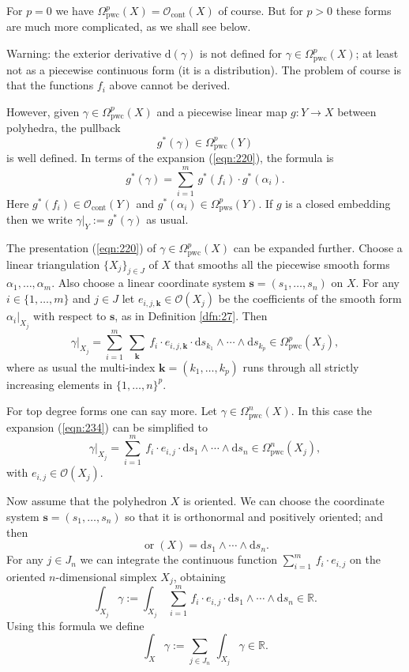 \documentclass[10pt, a4paper]{amsart}
\theoremstyle{definition}
\numberwithin{equation}{section}
\newcommand{\opn}{\operatorname}
\newcommand{\mcal}[1]{\mathcal{#1}}
\newcommand{\mrm}[1]{\mathrm{#1}}
\newcommand{\mbb}[1]{\mathbb{#1}}
\newcommand{\bsym}[1]{\boldsymbol{#1}}
\newcommand{\R}{\mbb{R}}
\renewcommand{\d}{\mrm{d}}
\begin{document}
For $p = 0$ we have 
$\Omega^p_{\mrm{pwc}}(X) = \mcal{O}_{\mrm{cont}}(X)$ of course. 
But for $p > 0$ these forms are much more complicated, as we shall see below.

Warning: the exterior derivative $\d (\gamma)$ is not defined for 
$\gamma \in \Omega^p_{\mrm{pwc}}(X)$; at least not as a piecewise continuous
form (it is a distribution). The problem of course is that the functions $f_i$ 
above cannot be derived.

However, given $\gamma \in \Omega^p_{\mrm{pwc}}(X)$ and a piecewise linear map
$g
: Y \to X$ between polyhedra, the pullback
\[ g^*(\gamma) \in \Omega^p_{\mrm{pwc}}(Y) \]
is well defined. In terms of the expansion (\ref{eqn:220}), the formula is
\[ g^*(\gamma) = \sum_{i = 1}^m \, g^*(f_i) \cdot g^*(\alpha_i) . \]
Here $g^*(f_i) \in \mcal{O}_{\mrm{cont}}(Y)$ and
$g^*(\alpha_i) \in \Omega^p_{\mrm{pws}}(Y)$. 
If $g$ is a closed embedding then we write
$\gamma|_Y := g^*(\gamma)$ as usual.

The presentation (\ref{eqn:220}) of 
$\gamma \in \Omega^p_{\mrm{pwc}}(X)$ can be expanded further. 
Choose a linear triangulation $\{ X_j \}_{j \in J}$ of $X$ that smooths all the
piecewise smooth forms $\alpha_1, \ldots, \alpha_m$. 
Also choose a linear coordinate system $\bsym{s} = (s_1, \ldots, s_n)$ on $X$.
For any $i \in \{ 1, \ldots, m \}$ and $j \in J$ let 
$e_{i, j, \bsym{k}} \in \mcal{O}(X_j)$ be the coefficients of the smooth form
$\alpha_i|_{X_j}$ with respect to $\bsym{s}$, as in Definition \ref{dfn:27}.
Then
\begin{equation} \label{eqn:234}
\gamma|_{X_j} = \sum_{i = 1}^m \ \sum_{\bsym{k}} \ 
f_i \cdot e_{i, j, \bsym{k}} \cdot 
\d s_{k_1} \wedge \cdots \wedge \d s_{k_p} 
\in \Omega^p_{\mrm{pwc}}(X_j) ,
\end{equation}
where as usual the multi-index 
$\bsym{k} = (k_1, \ldots, k_p)$ runs through all strictly increasing elements in
$\{ 1, \ldots, n \}^p$. 

For top degree forms one can say more. 
Let $\gamma \in \Omega^n_{\mrm{pwc}}(X)$. In this case the expansion 
(\ref{eqn:234}) can be simplified to 
\begin{equation} \label{eqn:235}
\gamma|_{X_j} = \sum_{i = 1}^m  \ 
f_i \cdot e_{i, j} \cdot \d s_1 \wedge \cdots \wedge \d s_n
\in \Omega^n_{\mrm{pwc}}(X_j) ,
\end{equation}
with $e_{i, j} \in \mcal{O}(X_j)$.

Now assume that the polyhedron $X$ is oriented. We can choose the coordinate
system $\bsym{s} = (s_1, \ldots, s_n)$ so that it is orthonormal and positively
oriented; and then 
\[ \opn{or}(X) = \d s_1 \wedge \cdots \wedge \d s_n . \]
For any $j \in J_n$ we can integrate the continuous function 
$\sum_{i = 1}^m \, f_i \cdot e_{i, j}$ on the oriented $n$-dimensional
simplex $X_j$, obtaining
\[ \int_{X_j} \gamma := \int_{X_j} \
\sum_{i = 1}^m \, f_i \cdot e_{i, j} \cdot 
\d s_1 \wedge \cdots \wedge \d s_n \in \R . \]
Using this formula we define
\begin{equation} \label{eqn:236}
\int_{X} \gamma := \sum_{j \in J_n}  \ \int_{X_j} \gamma
\in \R . 
\end{equation}
\end{document}
